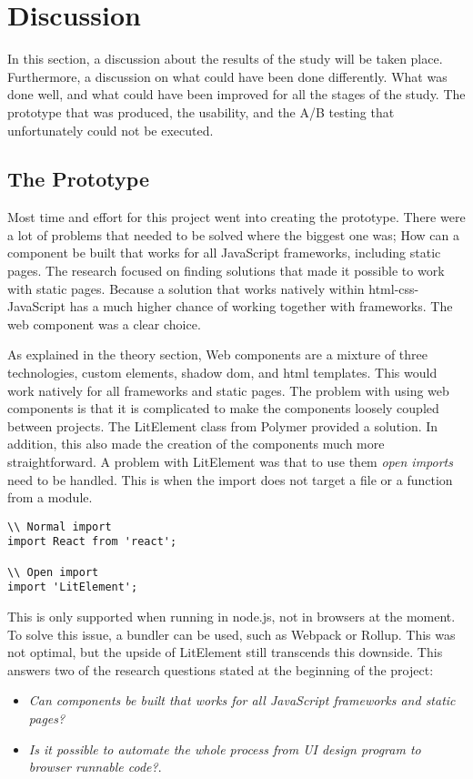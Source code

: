 \section{Discussion}

In this section, a discussion about the results of the study will be taken place. Furthermore, a discussion on what could have been done differently. What was done well, and what could have been improved for all the stages of the study. The prototype that was produced, the usability, and the A/B testing that unfortunately could not be executed.


\subsection{The Prototype}%
\label{sub:The Prototype}
Most time and effort for this project went into creating the prototype. 
There were a lot of problems that needed to be solved where the biggest one was; How can a component be built that works for all JavaScript frameworks, including static pages. The research focused on finding solutions that made it possible to work with static pages. Because a solution that works natively within \acrshort{html}-\acrshort{css}-JavaScript has a much higher chance of working together with frameworks. The web component was a clear choice.

As explained in the theory section, Web components are a mixture of three technologies, custom elements, shadow \acrshort{dom}, and \acrshort{html} templates. This would work natively for all frameworks and static pages. The problem with using web components is that it is complicated to make the components loosely coupled between projects. The LitElement class from Polymer provided a solution. In addition, this also made the creation of the components much more straightforward. A problem with LitElement was that to use them \textit{open imports} need to be handled. This is when the import does not target a file or a function from a module.


\begin{lstlisting}[style=htmlcssjs]
\\ Normal import
import React from 'react';

\\ Open import 
import 'LitElement';
\end{lstlisting}

This is only supported when running in node.js, not in browsers at the moment. To solve this issue, a bundler can be used, such as Webpack\cite{Webpack} or Rollup\cite{RollupJs}. This was not optimal, but the upside of LitElement still transcends this downside. This answers two of the research questions stated at the beginning of the project:
\begin{itemize}
  \item \textit{Can components be built that works for all JavaScript frameworks and static pages?} 
  \item \textit{Is it possible to automate the whole process from UI design program to browser runnable code?}.
\end{itemize}

